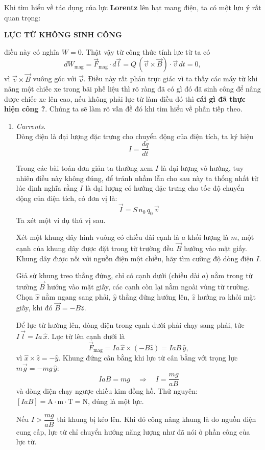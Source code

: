 Khi tìm hiểu về tác dụng của lực \textbf{Lorentz} lên hạt mang điện, ta có một lưu ý rất quan trọng:
\begin{center}
\textbf{LỰC TỪ KHÔNG SINH CÔNG}
\end{center}
điều này có nghĩa $W = 0$. Thật vậy từ công thức tính lực từ ta có
\[
dW_{\text{mag}} = \vec{F}_{\text{mag}} \cdot d\vec{l} = Q\,(\vec{v} \times \vec{B}) \cdot \vec{v}\,dt = 0,
\]
vì $\vec{v} \times \vec{B}$ vuông góc với $\vec{v}$. Điều này rất phản trực giác vì ta thấy các máy từ khi nâng một chiếc xe trong bãi phế liệu thì rõ ràng đã có gì đó đã sinh công để nâng được chiếc xe lên cao, nếu không phải lực từ làm điều đó thì \textbf{cái gì đã thực hiện công ?}. Chúng ta sẽ làm rõ vấn đề đó khi tìm hiểu về phần tiếp theo.

\begin{enumerate}
\item \textit{Currents.}\\
Dòng điện là đại lượng đặc trưng cho chuyển động của điện tích, ta ký hiệu
\[
I = \frac{dq}{dt}
\]

Trong các bài toán đơn giản ta thường xem $I$ là đại lượng vô hướng, tuy nhiên điều này không đúng, để tránh nhầm lẫn cho sau này ta thống nhất từ lúc định nghĩa rằng $I$ là đại lượng có hướng đặc trưng cho tốc độ chuyển động của điện tích, có đơn vị là:
\[
\vec{I} = S\,n_{0}\,q_{0}\,\vec{v}
\]
Ta xét một ví dụ thú vị sau.
\begin{example}
Xét một khung dây hình vuông có chiều dài cạnh là $a$ khối lượng là $m$, một cạnh của khung dây được đặt trong từ trường đều $\vec{B}$ hướng vào mặt giấy. Khung dây được nối với nguồn điện một chiều, hãy tìm cường độ dòng điện $I$.
\end{example}
\begin{sol}
Giả sử khung treo thẳng đứng, chỉ có cạnh dưới (chiều dài $a$) nằm trong từ trường $\vec{B}$ hướng vào mặt giấy, các cạnh còn lại nằm ngoài vùng từ trường. Chọn $\hat{x}$ nằm ngang sang phải, $\hat{y}$ thẳng đứng hướng lên, $\hat{z}$ hướng ra khỏi mặt giấy, khi đó $\vec{B} = -B\hat{z}$.

Để lực từ hướng lên, dòng điện trong cạnh dưới phải chạy sang phải, tức $I\,\vec{l} = Ia\,\hat{x}$. Lực từ lên cạnh dưới là
\[
\vec{F}_{\text{mag}} = Ia\,\hat{x} \times (-B\hat{z}) = IaB\,\hat{y},
\]
vì $\hat{x} \times \hat{z} = -\hat{y}$. Khung đứng cân bằng khi lực từ cân bằng với trọng lực $m\vec{g} = -mg\,\hat{y}$:
\[
IaB = mg
\quad\Rightarrow\quad
\boxed{I = \frac{mg}{aB}}
\]
và dòng điện chạy ngược chiều kim đồng hồ. Thứ nguyên: $[IaB] = \text{A}\cdot\text{m}\cdot\text{T} = \text{N}$, đúng là một lực.

Nếu $I > \dfrac{mg}{aB}$ thì khung bị kéo lên. Khi đó công nâng khung là do nguồn điện cung cấp, lực từ chỉ chuyển hướng năng lượng như đã nói ở phần công của lực từ.
\end{sol}
\end{enumerate}

